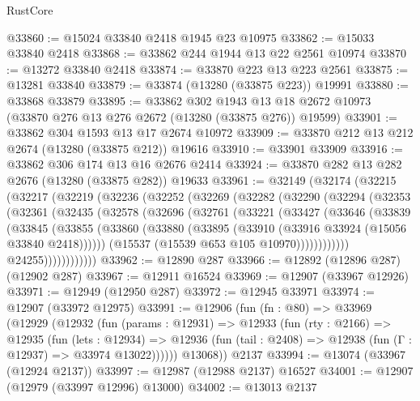 \begin{lexlean}{RustCore}
\begin{coremodule}
@33860 := @15024 @33840 @2418 @1945 @23 @10975
@33862 := @15033 @33840 @2418
@33868 := @33862 @244 @1944 @13 @22 @2561 @10974
@33870 := @13272 @33840 @2418
@33874 := @33870 @223 @13 @223 @2561
@33875 := @13281 @33840
@33879 := @33874 (@13280 (@33875 @223)) @19991
@33880 := @33868 @33879
@33895 := @33862
    @302
    @1943
    @13
    @18
    @2672
    @10973
    (@33870 @276 @13 @276 @2672 (@13280 (@33875 @276)) @19599)
@33901 := @33862 @304 @1593 @13 @17 @2674 @10972
@33909 := @33870 @212 @13 @212 @2674 (@13280 (@33875 @212)) @19616
@33910 := @33901 @33909
@33916 := @33862 @306 @174 @13 @16 @2676 @2414
@33924 := @33870 @282 @13 @282 @2676 (@13280 (@33875 @282)) @19633
@33961 := @32149
    (@32174
      (@32215
        (@32217
          (@32219
            (@32236
              (@32252
                (@32269
                  (@32282
                    (@32290
                      (@32294
                        (@32353
                          (@32361
                            (@32435
                              (@32578
                                (@32696
                                  (@32761
                                    (@33221
                                      (@33427
                                        (@33646
                                          (@33839
                                            (@33845
                                              (@33855
                                                (@33860
                                                  (@33880
                                                    (@33895
                                                      (@33910
                                                        (@33916 @33924 (@15056 @33840 @2418))))))
                                                (@15537 (@15539 @653 @105 @10970))))))))))))
                            @24255))))))))))))
@33962 := @12890 @287
@33966 := @12892 (@12896 @287) (@12902 @287)
@33967 := @12911 @16524
@33969 := @12907 (@33967 @12926)
@33971 := @12949 (@12950 @287)
@33972 := @12945 @33971
@33974 := @12907 (@33972 @12975)
@33991 := @12906
    (fun (fn : @80) =>
    @33969
      (@12929
        (@12932
          (fun (params : @12931) =>
          @12933
            (fun (rty : @2166) =>
            @12935
              (fun (lets : @12934) =>
              @12936 (fun (tail : @2408) => @12938 (fun (Γ : @12937) => @33974 @13022))))))
        @13068))
    @2137
@33994 := @13074 (@33967 (@12924 @2137))
@33997 := @12987 (@12988 @2137) @16527
@34001 := @12907 (@12979 (@33997 @12996) @13000)
@34002 := @13013 @2137

\end{coremodule}
\end{lexlean}

